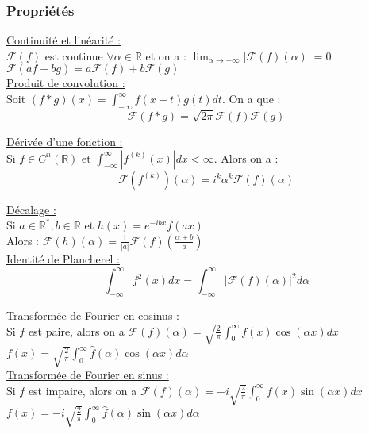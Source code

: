 \documentclass[../main.tex]{subfiles}
\begin{document}
\subsubsection{Propriétés}
\quad \underline{Continuité et linéarité :}\\
$\mathcal{F}(f)$ est continue $\forall \alpha\in \mathbb{R}$ et on a : $\lim_{\alpha \rightarrow\pm \infty} |\mathcal{F}(f)(\alpha)| = 0$\\
$\mathcal{F}(af+bg) = a\mathcal{F}(f)+b\mathcal{F}(g)$\\

\quad \underline{Produit de convolution :}\\
Soit $(f*g)(x) = \int_{-\infty}^{\infty} f(x-t)g(t)dt$. On a que :\\
\begin{equation}
    \mathcal{F}(f*g) = \sqrt{2\pi} \mathcal{F}(f) \mathcal{F}(g)
\end{equation}

\quad \underline{Dérivée d'une fonction :}\\
Si $f\in C^n(\mathbb{R})$ et $\int_{-\infty}^{\infty} |f^{(k)}(x)|dx <\infty$. Alors on a :\\
\begin{equation}
    \mathcal{F}(f^{(k)})(\alpha) = i^k \alpha^k \mathcal{F}(f)(\alpha)
\end{equation}

\quad\underline{Décalage :}\\
Si $a\in \mathbb{R}^*, b\in \mathbb{R}$ et $h(x) = e^{-ibx}f(ax)$ \\
Alors : $\mathcal{F}(h)(\alpha) = \frac{1}{|a|} \mathcal{F}(f)(\frac{\alpha+b}{a})$\\

\quad \underline{Identité de Plancherel :}\\
\begin{equation}
    \int_{-\infty}^{\infty} f^2(x) dx = \int_{-\infty}^{\infty} |\mathcal{F}(f)(\alpha)|^2d\alpha
\end{equation}

\quad \underline{Transformée de Fourier en cosinus :}\\
Si $f$ est paire, alors on a $\mathcal{F}(f)(\alpha) = \sqrt{\frac{2}{\pi}} \int_0^{\infty} f(x) \cos(\alpha x)dx$\\
$f(x) = \sqrt{\frac{2}{\pi}} \int_0^{\infty} \hat{f}(\alpha) \cos(\alpha x)d\alpha$\\

\quad \underline{Transformée de Fourier en sinus :}\\
Si $f$ est impaire, alors on a $\mathcal{F}(f)(\alpha) = -i\sqrt{\frac{2}{\pi}} \int_0^{\infty} f(x) \sin(\alpha x)dx$\\
$f(x) = -i\sqrt{\frac{2}{\pi}} \int_0^{\infty} \hat{f}(\alpha) \sin(\alpha x)d\alpha$\\
\end{document}
